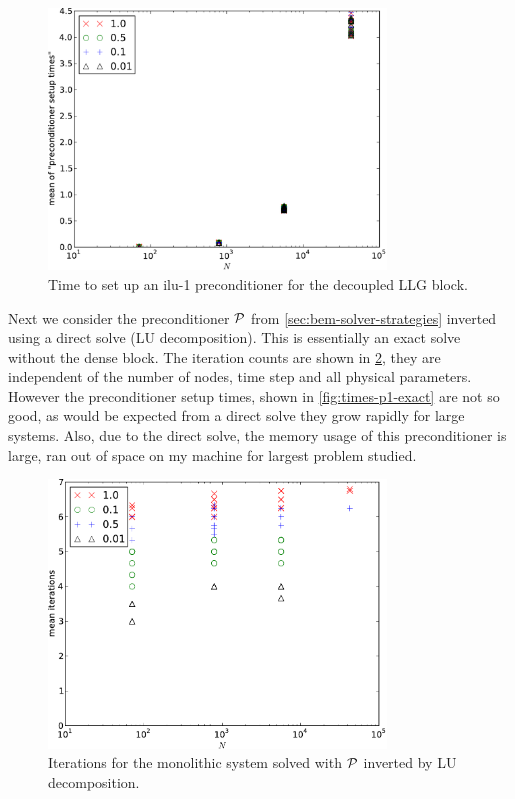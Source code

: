 \begin{figure}
  \centering
  \includegraphics[width=0.8\textwidth]{plots/linear_solvers/ilu-1decoupleddummy-meanofpreconditionersetuptimesvsinitialnnode.pdf}
  \caption{Time to set up an ilu-1 preconditioner for the decoupled LLG block.}
  \label{fig:times-ilu-decoupled}
\end{figure}


Next we consider the preconditioner $\mathcal{P}$ from \cref{sec:bem-solver-strategies} inverted using a direct solve (LU decomposition).
This is essentially an exact solve without the dense block.
The iteration counts are shown in \cref{fig:its-p1-exact}, they are independent of the number of nodes, time step and all physical parameters.
However the preconditioner setup times, shown in \cref{fig:times-p1-exact} are not so good, as would be expected from a direct solve they grow rapidly for large systems.
Also, due to the direct solve, the memory usage of this preconditioner is large, ran out of space on my machine for largest problem studied.

\begin{figure}
  \centering
  \includegraphics[width=0.8\textwidth]{plots/linear_solvers/som-main-exactimplicitdummy-meanofnsolveritersvsinitialnnode.pdf}
  \caption{Iterations for the monolithic system solved with $\mathcal{P}$ inverted by LU decomposition.}
  \label{fig:its-p1-exact}
\end{figure}


